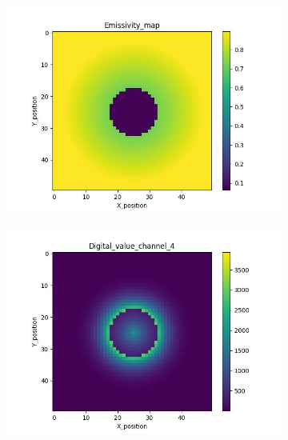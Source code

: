 {\begin{figure}[htbp]
\begin{minipage}{\textwidth}
    \end{minipage}\\
    \begin{minipage}{\textwidth}
        \centering
        \begin{subfigure}{0.45\textwidth}
            \includegraphics[width=\textwidth]{figures/raw_data/21/emi_field.jpg}
        \end{subfigure}
        \begin{subfigure}{0.45\textwidth}
            \centering
            \includegraphics[width=\textwidth]{figures/raw_data/21/digital_value_channel_4.jpg}
        \end{subfigure}
        \label{fig: raw_data_21}

\end{minipage}
\end{figure}}
